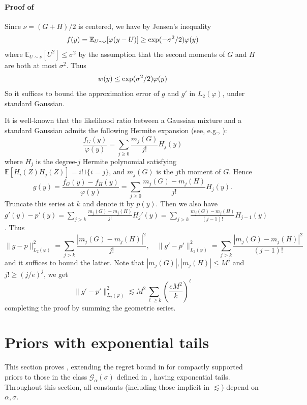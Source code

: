 \documentclass[letterpaper,11pt]{article}
\def\exp{\mathop{\rm exp}}
\newcommand{\Expect}{\mathbb{E}}
\newcommand{\pth}[1]{\left( #1 \right)}
\newcommand{\indc}[1]{{1\{{#1}\}}}
\newcommand{\calG}{{\mathcal{G}}}
\theoremstyle{definition}
\begin{document}
    \paragraph{Proof of }
    Since $\nu=(G+H)/2$ is centered, we have by Jensen's inequality
    \[
      f(y) = \Expect_{U\sim \nu}[\varphi(y-U)]
      \geq \exp(-\sigma^2/2) \varphi(y)
    \]
    where $\Expect_{U\sim \nu}[U^2] \leq \sigma^2$ by the assumption that the second moments of $G$ and $H$ are both at most $\sigma^2$.
    Thus
    \begin{equation}
      w(y) \leq \exp(\sigma^2/2) \varphi(y)
        \label{eq:w-phi}
    \end{equation}
    So it suffices to bound the approximation error of $g$ and $g'$ in $L_2(\varphi)$, under standard Gaussian.

    It is well-known that the likelihood ratio between a Gaussian mixture and a standard
    Gaussian admits the following Hermite expansion (see, e.g., \cite[Lemma 9]{WY18}):
    \[
      \frac{f_G(y)}{\varphi(y)} = \sum_{j\geq 0} \frac{m_j(G)}{j!} H_j(y)
    \]
    where $H_j$ is the degree-$j$ Hermite polynomial satisfying $\Expect[H_i(Z)H_j(Z)]=i! \indc{i=j}$, and $m_j(G)$ is the $j$th moment of $G$.
    Hence
    \[
      g(y) =
      \frac{f_G(y)-f_H(y)}{\varphi(y)} = \sum_{j\geq 0} \frac{m_j(G)-m_j(H)}{j!} H_j(y).
    \]
    Truncate this series at $k$ and denote it by $p(y)$. Then we also have
    $g'(y)-p'(y) =
    \sum_{j>k} \frac{m_j(G)-m_j(H)}{j!} H_j'(y) =
    \sum_{j>k} \frac{m_j(G)-m_j(H)}{(j-1)!} H_{j-1}(y)$.
    Thus
    \[
      \|g-p\|_{L_2(\varphi)}^2 = \sum_{j>k} \frac{|m_j(G)-m_j(H)|^2}{j!},
      \quad
      \|g'-p'\|_{L_2(\varphi)}^2 = \sum_{j>k} \frac{|m_j(G)-m_j(H)|^2}{(j-1)!}
    \]
    and it suffices to bound the latter.
    Note that $|m_j(G)|,|m_j(H)| \leq M^j$ and $j! \geq (j/e)^j$, we get
    \begin{equation}
      \|g'-p'\|_{L_2(\varphi)}^2
      \lesssim M^2 \sum_{\ell\geq k} \pth{\frac{eM^2}{k}}^\ell
      \label{eq:gp-compact}
    \end{equation}
    completing the proof by summing the geometric series.


\section{Priors with exponential tails}
\label{sec:exp}

This section proves , extending the regret bound in 
 for compactly supported priors to those in the class
$\calG_\alpha(\sigma)$ defined in , having exponential tails. Throughout this section, all constants (including those implicit in $\lesssim$) depend on $\alpha,\sigma$.
\end{document}
